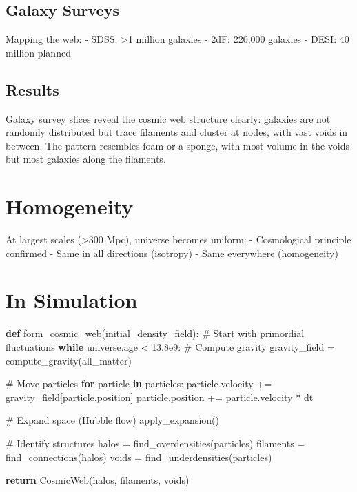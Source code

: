 \documentclass[
  11pt,
  letterpaper,
  twoside,
  openright]{book}
\newenvironment{Shaded}{\begin{snugshade}}{\end{snugshade}}
\newcommand{\CommentTok}[1]{\textcolor[rgb]{0.37,0.37,0.37}{#1}}
\newcommand{\ControlFlowTok}[1]{\textcolor[rgb]{0.00,0.23,0.31}{\textbf{#1}}}
\newcommand{\FloatTok}[1]{\textcolor[rgb]{0.68,0.00,0.00}{#1}}
\newcommand{\KeywordTok}[1]{\textcolor[rgb]{0.00,0.23,0.31}{\textbf{#1}}}
\newcommand{\NormalTok}[1]{\textcolor[rgb]{0.00,0.23,0.31}{#1}}
\newcommand{\OperatorTok}[1]{\textcolor[rgb]{0.37,0.37,0.37}{#1}}
\begin{document}
\subsection{Galaxy Surveys}\label{galaxy-surveys}

Mapping the web: - SDSS: \textgreater1 million galaxies - 2dF: 220,000
galaxies - DESI: 40 million planned

\subsection{Results}\label{results}

Galaxy survey slices reveal the cosmic web structure clearly: galaxies
are not randomly distributed but trace filaments and cluster at nodes,
with vast voids in between. The pattern resembles foam or a sponge, with
most volume in the voids but most galaxies along the filaments.

\section{Homogeneity}\label{homogeneity}

At largest scales (\textgreater300 Mpc), universe becomes uniform: -
Cosmological principle confirmed - Same in all directions (isotropy) -
Same everywhere (homogeneity)

\section{In Simulation}\label{in-simulation-18}

\begin{Shaded}
\begin{Highlighting}[]
\KeywordTok{def}\NormalTok{ form\_cosmic\_web(initial\_density\_field):}
    \CommentTok{\# Start with primordial fluctuations}
    \ControlFlowTok{while}\NormalTok{ universe.age }\OperatorTok{\textless{}} \FloatTok{13.8e9}\NormalTok{:}
        \CommentTok{\# Compute gravity}
\NormalTok{        gravity\_field }\OperatorTok{=}\NormalTok{ compute\_gravity(all\_matter)}

        \CommentTok{\# Move particles}
        \ControlFlowTok{for}\NormalTok{ particle }\KeywordTok{in}\NormalTok{ particles:}
\NormalTok{            particle.velocity }\OperatorTok{+=}\NormalTok{ gravity\_field[particle.position]}
\NormalTok{            particle.position }\OperatorTok{+=}\NormalTok{ particle.velocity }\OperatorTok{*}\NormalTok{ dt}

        \CommentTok{\# Expand space (Hubble flow)}
\NormalTok{        apply\_expansion()}

    \CommentTok{\# Identify structures}
\NormalTok{    halos }\OperatorTok{=}\NormalTok{ find\_overdensities(particles)}
\NormalTok{    filaments }\OperatorTok{=}\NormalTok{ find\_connections(halos)}
\NormalTok{    voids }\OperatorTok{=}\NormalTok{ find\_underdensities(particles)}

    \ControlFlowTok{return}\NormalTok{ CosmicWeb(halos, filaments, voids)}
\end{Highlighting}
\end{Shaded}
\end{document}
